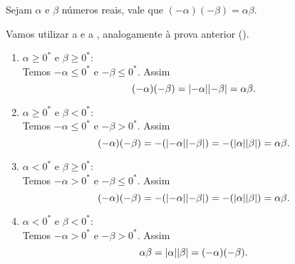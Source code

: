 \documentclass[../main.tex]{subfiles}
\begin{document}
\begin{prop}\label{reais-teo-regraSinaisProduto2}
    Sejam $\alpha$ e $\beta$ números reais, vale que $\left( -\alpha \right) \left( -\beta \right) = \alpha \beta$.
\end{prop}
\begin{dem}
    Vamos utilizar a  e a , analogamente à prova anterior ().
    \begin{enumerate}
        \item $\alpha \geq 0^*$ e $\beta \geq 0^*$: \\
            Temos $-\alpha \leq 0^*$ e $-\beta \leq 0^*$. Assim
            \[ (-\alpha)(-\beta) = \abs{-\alpha}\abs{-\beta} = \alpha\beta.\]
        
        \item $\alpha \geq 0^*$ e $\beta < 0^*$: \\
        Temos $-\alpha \leq 0^*$ e $-\beta > 0^*$. Assim
            \[ (-\alpha)(-\beta) = -(\abs{-\alpha}\abs{-\beta}) = -(\abs{\alpha}\abs{\beta}) = \alpha\beta .\]
        \item $\alpha < 0^*$ e $\beta \geq 0^*$: \\
         Temos $-\alpha > 0^*$ e $-\beta \leq 0^*$. Assim
         \[ (-\alpha)(-\beta) = -(\abs{-\alpha}\abs{-\beta}) = -(\abs{\alpha}\abs{\beta}) = \alpha\beta .\]
        \item $\alpha < 0^*$ e $\beta < 0^*$: \\
            Temos $-\alpha > 0^*$ e $-\beta > 0^*$. Assim
            \[\alpha\beta = \abs{\alpha}\abs{\beta} = (-\alpha)(-\beta). \]
    \end{enumerate}
\end{dem}
\end{document}
